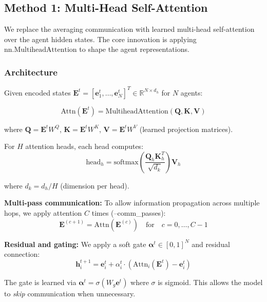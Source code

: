 \subsection{Method 1: Multi-Head Self-Attention}
\label{subsec:attention}

We replace the averaging communication with learned multi-head self-attention over the agent hidden states. The core innovation is applying $\text{nn.MultiheadAttention}$ to shape the agent representations.

\subsubsection{Architecture}

Given encoded states $\mathbf{E}^t = [\mathbf{e}_1^t, \ldots, \mathbf{e}_N^t]^T \in \mathbb{R}^{N \times d_h}$ for $N$ agents:

\begin{equation}
\text{Attn}(\mathbf{E}^t) = \text{MultiheadAttention}(\mathbf{Q}, \mathbf{K}, \mathbf{V})
\end{equation}

where $\mathbf{Q} = \mathbf{E}^t W^Q$, $\mathbf{K} = \mathbf{E}^t W^K$, $\mathbf{V} = \mathbf{E}^t W^V$ (learned projection matrices).

For $H$ attention heads, each head computes:
\begin{equation}
\text{head}_h = \text{softmax}\left(\frac{\mathbf{Q}_h \mathbf{K}_h^T}{\sqrt{d_k}}\right) \mathbf{V}_h
\end{equation}

where $d_k = d_h / H$ (dimension per head).

\textbf{Multi-pass communication:} To allow information propagation across multiple hops, we apply attention $C$ times (--comm\_passes):
\begin{equation}
\mathbf{E}^{(c+1)} = \text{Attn}(\mathbf{E}^{(c)}) \quad \text{for} \quad c = 0, \ldots, C-1
\end{equation}

\textbf{Residual and gating:} We apply a soft gate $\boldsymbol{\alpha}^t \in [0,1]^{N}$ and residual connection:
\begin{equation}
\mathbf{h}_i^{t+1} = \mathbf{e}_i^t + \alpha_i^t \cdot (\text{Attn}_i(\mathbf{E}^t) - \mathbf{e}_i^t)
\end{equation}

The gate is learned via $\boldsymbol{\alpha}^t = \sigma(W_g \mathbf{e}^t)$ where $\sigma$ is sigmoid. This allows the model to \emph{skip} communication when unnecessary.

